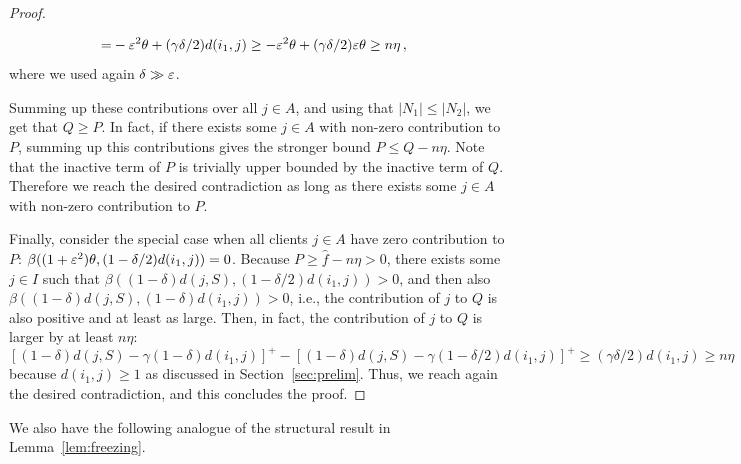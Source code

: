\begin{proof}
\begin{itemize}
\begin{align*}
    =& -\varepsilon^2 \theta + (\gamma \delta / 2) d(i_1, j)
    \geq -\varepsilon^2 \theta + (\gamma \delta / 2) \varepsilon \theta
    \geq n \eta\,,
    \end{align*}
    where we used again $\delta \gg \varepsilon$.
\end{itemize}
Summing up these contributions over all $j \in A$, and using that $|N_1| \leq |N_2|$, we get that $Q \geq P$.
In fact, if there exists some $j \in A$ with non-zero contribution to $P$, summing up this contributions gives the stronger bound $P \leq Q - n \eta$.
Note that the inactive term of $P$ is trivially upper bounded by the inactive term of $Q$.
Therefore we reach the desired contradiction as long as there exists some $j \in A$ with non-zero contribution to $P$.

Finally, consider the special case when all clients $j \in A$ have zero contribution to $P$: $\beta((1+\varepsilon^2)\theta, (1-\delta/2)d(i_1, j)) = 0$.
Because $P \geq \hat f - n \eta > 0$, there exists some $j \in I$ such that $\beta((1-\delta)d(j,S), (1-\delta/2)d(i_1, j)) > 0$, and then also $\beta((1-\delta)d(j,S), (1-\delta)d(i_1, j)) > 0$, i.e., the contribution of $j$ to $Q$ is also positive and at least as large.
Then, in fact, the contribution of $j$ to $Q$ is larger by at least $n \eta$:
\[[(1-\delta)d(j,S) - \gamma(1-\delta)d(i_1,j)]^+ - [(1-\delta)d(j,S) - \gamma(1-\delta/2)d(i_1,j)]^+ \geq (\gamma\delta/2)d(i_1,j) \geq n\eta\]
because $d(i_1,j) \geq 1$ as discussed in Section~\ref{sec:prelim}.
Thus, we reach again the desired contradiction, and this concludes the proof.
\end{proof}

We also have the following analogue of the structural result in Lemma~\ref{lem:freezing}.

